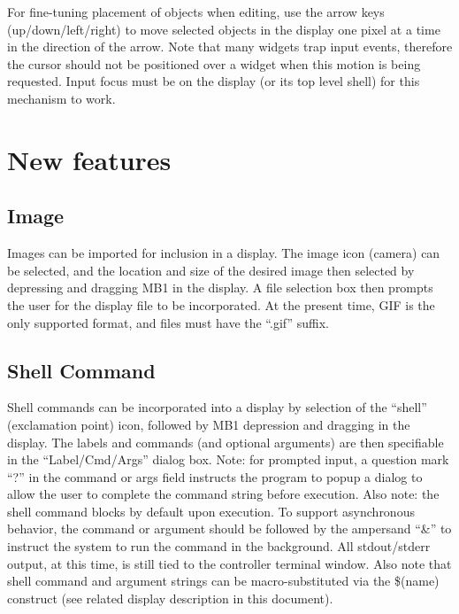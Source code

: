 \noindent For fine-tuning placement of objects when editing, use the arrow keys
(up/down/left/right) to move selected objects in the display one pixel
at a time in the direction of the arrow.  Note that many widgets trap
input events, therefore  the cursor should not be positioned over a
widget when this motion is being requested.  Input focus must be
on the display (or its top level shell) for this mechanism to work.\\


\section{New features}

\subsection{Image}

Images can be imported for inclusion in a display.  The image
icon (camera) can be selected, and the location and size of
the desired image then selected by depressing and dragging
MB1 in the display.  A file selection box then prompts the
user for the display file to be incorporated.  At the present
time, GIF is the only supported format, and files must have
the ``.gif'' suffix.\\

\subsection{Shell Command}

Shell commands can be incorporated into a display
by selection of the ``shell'' (exclamation point) icon,
followed by MB1 depression
and dragging in the display.  The labels and commands (and
optional arguments) are then specifiable in the ``Label/Cmd/Args''
dialog box.  Note:  for prompted input, a question mark ``?'' in
the command or args field instructs the program to popup a
dialog to allow the user to complete the command string before
execution.  Also note:  the shell command blocks by default
upon execution.  To support asynchronous behavior, the command
or argument should be followed by the ampersand ``\&'' to instruct
the system to run the command in the background.  All stdout/stderr
output, at this time, is still tied to the controller terminal
window.  Also note that shell command and argument strings can
be macro-substituted via the \$(name) construct (see related
display description in this document).\\

